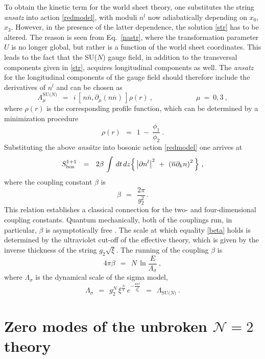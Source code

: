 \documentclass[12pt]{article}
\def\beq{\begin{equation}}
\def\eeq{\end{equation}}
\newcommand{\ntwo}{${\mathcal N}=2$ }
\newcommand{\p}{\partial}
\newcommand{\ov}{\overline}
\newcommand{\LN}{\Lambda_\text{SU($N$)}}
\newcommand{\nbar}{\ov{n}}
\begin{document}
	To obtain the kinetic term for the world sheet theory, one substitutes the string {\it ansatz}
	into action \eqref{redmodel}, with moduli $ n^l $ now adiabatically
	depending on $ x_0 $, $ x_3 $.
	However, in the presence of the latter dependence, the solution \eqref{str} has to be altered.
	The reason is seen from Eq.~\eqref{nastr}, where the transformation parameter 
	$ U $ is no longer global, but rather is a function of the world sheet coordinates.
	This leads to the fact that the SU($N$) gauge field, in addition to the transversal components
	given in \eqref{str}, acquires longitudinal components as well.
	The {\it ansatz} for the longitudinal components of the gauge field should
	therefore include the derivatives of $ n^l $ and can be chosen as 
\[
	A_\mu^\text{SU($N$)} ~~=~~ i\, \left[\, n\nbar, \p_\mu(n\nbar)\, \right] \rho(r)~,   \qquad\qquad\qquad \mu~=~0, 3~,
\]
	where $ \rho(r) $ is the corresponding profile function, which can be determined by
	a minimization procedure \cite{SYrev}
\[
	\rho(r) ~~=~~ 1 ~-~ \frac{\phi_1}{\phi_2}~.
\]
	Substituting the above {\it ans\"{a}tze} into bosonic action \eqref{redmodel} one arrives
	at
\begin{align}
\label{cp}
	S_{\rm bos}^{1+1} ~~=~~ 2\beta\, \int\, dt\,dz 
					\Bigl\{\, \left|\p n^l\right|^2    
						  ~+~  \left(\nbar \p_k n\right)^2\,
					\Bigr\}~,
\end{align}
	where the coupling constant $ \beta $ is 
\beq
\label{beta}
	\beta ~~=~~ \frac{2\pi}{g_2^2}\,.
\eeq
	This relation establishes a classical connection for the two- and four-dimensional
	 coupling constants.
	Quantum mechanically, both of the couplings run, in particular, $ \beta $ is asymptotically
	free \cite{P75}.
	The scale at which equality \eqref{beta} holds is determined by the ultraviolet cut-off
	of the effective theory, which is given by the inverse thickness of the string $ g_2 \sqrt{\xi} $.
	The running of the coupling $ \beta $ is 
\beq
\label{asyfree}
	4 \pi \beta ~~=~~ N\,  \ln \frac{E}{\Lambda_\sigma}~,
\eeq
	where $ \Lambda_\sigma $ is the dynamical scale of the sigma model, 
\beq
\label{lambdasig}
	\Lambda_\sigma ~~=~~ g_2^N\, \xi^{\frac{N}{2}}\, e^{-\frac{8\pi^2}{g_2^2}} ~~=~~ \LN~.
\eeq


%
%
\section{Zero modes of the unbroken \boldmath\ntwo theory}
\label{zeromodes}
\setcounter{equation}{0}
\end{document}
